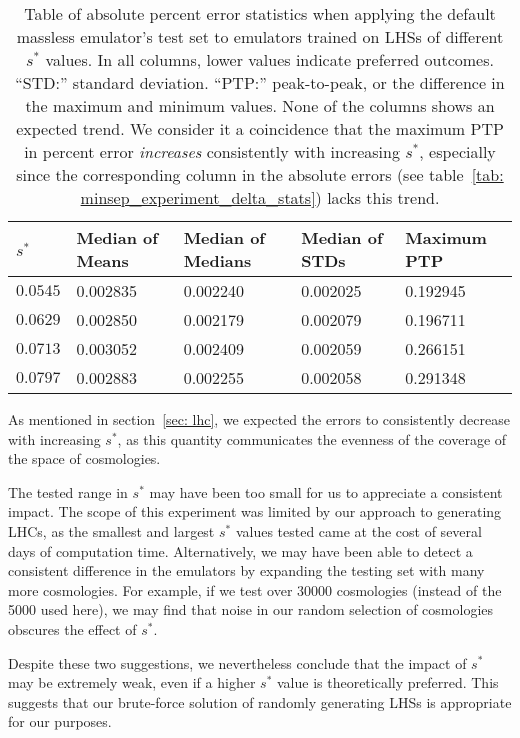 \begin{table}[ht!]
\centering
\begin{tabular}{l|l|l|l|l}
\hline
$s^*$ & Median of Means & Median of Medians & Median of STDs & Maximum PTP \\ \hline
$0.0545$ & 0.002835 & 0.002240 & 0.002025 & 0.192945 \\
$0.0629$ & 0.002850 & 0.002179 & 0.002079 & 0.196711 \\
$0.0713$ & 0.003052 & 0.002409 & 0.002059 & 0.266151 \\
$0.0797$ & 0.002883 & 0.002255 & 0.002058 & 0.291348 \\
\end{tabular}
	\cprotect\caption[$s^*$ Experiment: Percent Error Statistics]{Table of
		absolute percent error statistics
		when applying the default massless emulator's test
		set to emulators trained on LHSs of different $s^*$ values. In all
		columns, lower values indicate preferred outcomes. ``STD:'' standard
		deviation. ``PTP:'' peak-to-peak, or the difference in the maximum
		and minimum values. None of the columns shows an expected trend.
		We consider it a coincidence that the maximum PTP in percent error
		\textit{increases} consistently with increasing $s^*$, especially
		since the corresponding column in the absolute errors
		(see table~\ref{tab: minsep_experiment_delta_stats}) lacks this
		trend.}
 \label{tab: minsep_experiment_percerr_stats}
\end{table}

As mentioned in section~\ref{sec: lhc}, we expected the errors to consistently
decrease with increasing $s^*$, as this quantity communicates the evenness of 
the coverage of the space of cosmologies.

The tested range in $s^*$ may have been too small for us to appreciate a
consistent impact. The scope of this experiment was limited by our approach
to generating LHCs, as the smallest and largest $s^*$ values tested came at
the cost of several days of computation time. Alternatively, we may have been
able to detect a consistent difference in the emulators by expanding the
testing set with many more cosmologies. For example, if we test over
30000 cosmologies (instead of the 5000 used here), we may find that noise in
our random selection of cosmologies obscures the effect of $s^*$.

Despite these two suggestions, we nevertheless conclude that the impact of
$s^*$ may be extremely weak, even if a higher $s^*$ value is theoretically
preferred. This suggests that our brute-force solution of randomly generating
LHSs is appropriate for our purposes.


